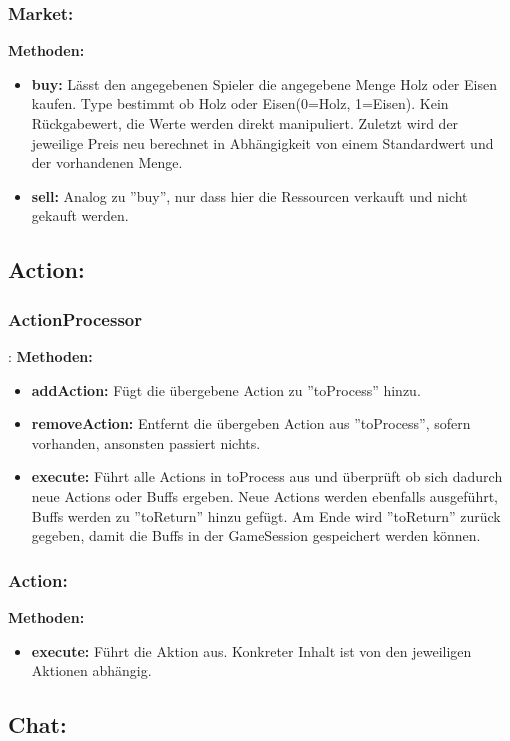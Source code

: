 \documentclass[fontsize=12pt,paper=a4,twoside]{scrartcl}
\begin{document}
\subsubsection{Market:}
\textbf{Methoden:}
\begin{itemize}
	\item \textbf{buy:} Lässt den angegebenen Spieler die angegebene Menge Holz oder Eisen kaufen. Type bestimmt ob Holz oder Eisen(0=Holz, 1=Eisen). Kein Rückgabewert, die Werte werden direkt manipuliert. Zuletzt wird der jeweilige Preis neu berechnet in Abhängigkeit von einem Standardwert und der vorhandenen Menge.
	\item \textbf{sell:} Analog zu ''buy'', nur dass hier die Ressourcen verkauft und nicht gekauft werden.
\end{itemize}

\subsection{Action:}
\subsubsection{ActionProcessor}:
\textbf{Methoden:}
\begin{itemize}
	\item \textbf{addAction:} Fügt die übergebene Action zu ''toProcess'' hinzu.
	\item \textbf{removeAction:} Entfernt die übergeben Action aus ''toProcess'', sofern vorhanden, ansonsten passiert nichts.
	\item \textbf{execute:} Führt alle Actions in toProcess aus und überprüft ob sich dadurch neue Actions oder Buffs ergeben. Neue Actions werden ebenfalls ausgeführt, Buffs werden zu ''toReturn'' hinzu gefügt. Am Ende wird ''toReturn'' zurück gegeben, damit die Buffs in der GameSession gespeichert werden können.
\end{itemize}

\subsubsection{Action:}
\textbf{Methoden:}
\begin{itemize}
	\item \textbf{execute:} Führt die Aktion aus. Konkreter Inhalt ist von den jeweiligen Aktionen abhängig.
\end{itemize}



\subsection{Chat:}
\end{document}
